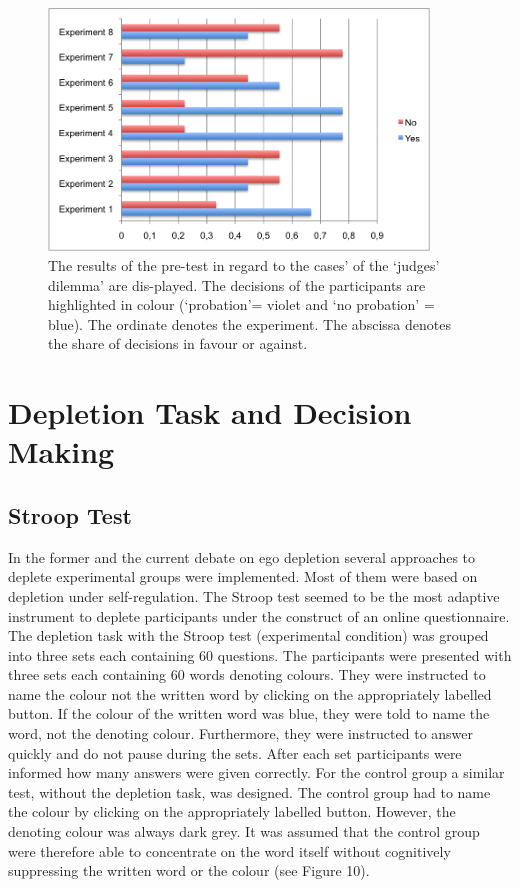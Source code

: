 \begin{figure}[h!]
\center
	\includegraphics[width=0.9\textwidth]{images/pretest_judges.png}
  \caption{The results of the pre-test in regard to the cases’ of the ‘judges’ dilemma’ are dis-played. The decisions of the participants are highlighted in colour (‘probation’= violet and ‘no probation’ = blue). The ordinate denotes the experiment. The abscissa denotes the share of decisions in favour or against.}\label{fig:pretest_judges}
\end{figure}

\section{Depletion Task and Decision Making}
\subsection{Stroop Test}
In the former \citep{muraven1998self,baumeister2002yielding} and the current \citep{unger2011ego,pocheptsova2009deciding} debate on ego depletion several approaches to deplete experimental groups were implemented. Most of them were based on depletion under self-regulation. The Stroop test \citep{stroop1935studies} seemed to be the most adaptive instrument to deplete participants under the construct of an online questionnaire. The depletion task with the Stroop test (experimental condition) was grouped into three sets each containing 60 questions. The participants were presented with three sets each containing 60 words denoting colours. They were instructed to name the colour not the written word by clicking on the appropriately labelled button. If the colour of the written word was blue, they were told to name the word, not the denoting colour. Furthermore, they were instructed to answer quickly and do not pause during the sets. After each set participants were informed how many answers were given correctly. For the control group a similar test, without the depletion task, was designed. The control group had to name the colour by clicking on the appropriately labelled button. However, the denoting colour was always dark grey. It was assumed that the control group were therefore able to concentrate on the word itself without cognitively suppressing the written word or the colour (see Figure 10). 

